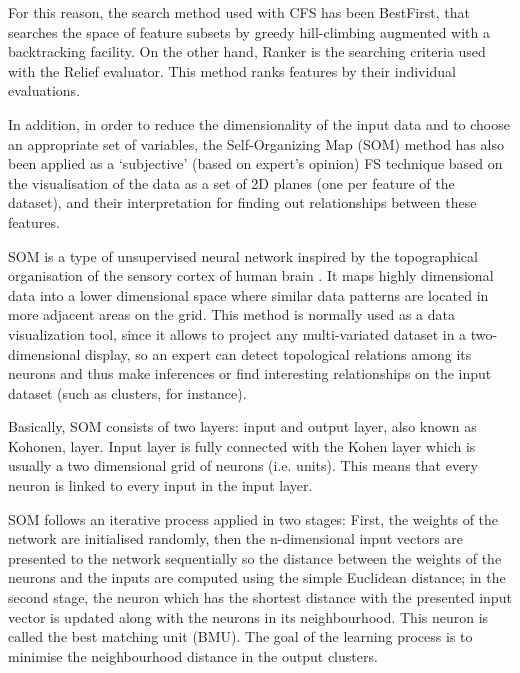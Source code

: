 \documentclass[a4paper,10pt,twocolumn,preprint,3p]{elsarticle}
\begin{document}
\begin{itemize}
For this reason, the search method used with CFS has been BestFirst, that searches the space of feature subsets by greedy hill-climbing augmented with a backtracking facility. On the other hand, Ranker is the searching criteria used with the Relief evaluator. This method ranks features by their individual evaluations.
\end{itemize}

In addition, in order to reduce the dimensionality of the input data
and to choose an appropriate set of variables, the Self-Organizing Map
(SOM) \cite{kohonen1998} method has also been applied as a `subjective' (based on expert's opinion) FS technique based on the visualisation of the data as a set of 2D planes (one per feature of the dataset), and their interpretation for finding out relationships between these features.



SOM is a type of unsupervised neural network inspired by the
topographical organisation of the sensory cortex of human brain
\cite{kohonen1998}. It maps highly dimensional data into a lower
dimensional space where similar data patterns are located in more
adjacent areas on the grid. 
This method is normally used as a data visualization tool, since it allows 
to project any multi-variated dataset in a two-dimensional display, 
so an expert can detect topological relations among its neurons and thus 
make inferences or find interesting relationships on the input dataset 
(such as clusters, for instance).

Basically, SOM consists of two layers: input and output layer, also
known as Kohonen, layer. Input layer is fully connected with the 
Kohen layer which is usually a two dimensional grid of neurons
(i.e. units). This means that every neuron is linked to every input in
the input layer. 

SOM follows an iterative process applied in two stages: First, the
weights of the network are initialised randomly, then the n-dimensional
input vectors are presented to the network sequentially so the
distance between the weights of the neurons and the inputs are
computed using the simple Euclidean distance; in the second stage, the
neuron which has the shortest distance with the presented input vector
is updated along with the neurons in its neighbourhood. 
This neuron is called the best matching unit (BMU). 
The goal of the learning process is to minimise the neighbourhood distance 
in the output clusters.  
\end{document}
